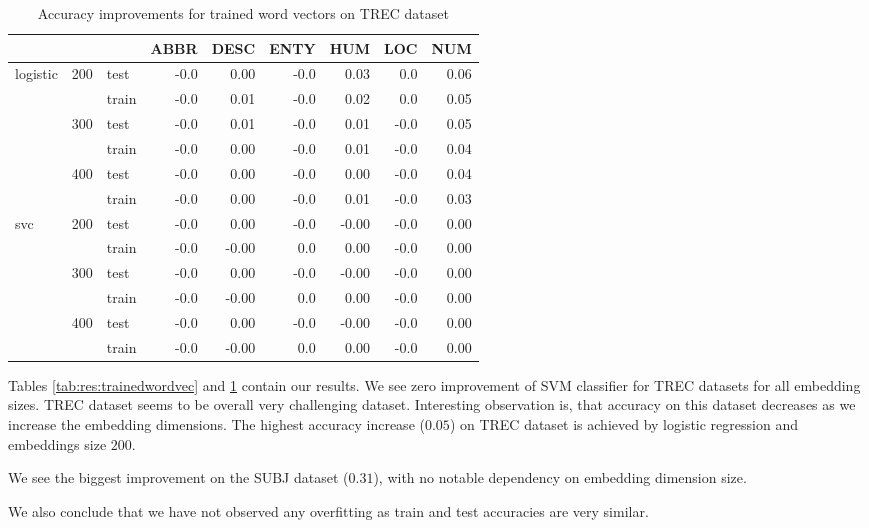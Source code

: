\begin{table}[H]
\begin{center}

\begin{tabular}{lllrrrrrr}
\toprule
 & &&ABBR &DESC &ENTY &HUM &LOC &NUM \\
\midrule
logistic & 200 & test &-0.0 &0.00 &-0.0 & 0.03 &0.0 & 0.06 \\
 & & train &-0.0 &0.01 &-0.0 & 0.02 &0.0 & 0.05 \\
 & 300 & test &-0.0 &0.01 &-0.0 & 0.01 & -0.0 & 0.05 \\
 & & train &-0.0 &0.00 &-0.0 & 0.01 & -0.0 & 0.04 \\
 & 400 & test &-0.0 &0.00 &-0.0 & 0.00 & -0.0 & 0.04 \\
 & & train &-0.0 &0.00 &-0.0 & 0.01 & -0.0 & 0.03 \\
svc & 200 & test &-0.0 &0.00 &-0.0 &-0.00 & -0.0 & 0.00 \\
 & & train &-0.0 & -0.00 & 0.0 & 0.00 & -0.0 & 0.00 \\
 & 300 & test &-0.0 &0.00 &-0.0 &-0.00 & -0.0 & 0.00 \\
 & & train &-0.0 & -0.00 & 0.0 & 0.00 & -0.0 & 0.00 \\
 & 400 & test &-0.0 &0.00 &-0.0 &-0.00 & -0.0 & 0.00 \\
 & & train &-0.0 & -0.00 & 0.0 & 0.00 & -0.0 & 0.00 \\
\bottomrule
\end{tabular}

\caption[Accuracy improvements for trained word vectors on TREC dataset]{Accuracy improvements for trained word vectors on TREC dataset}
\label{tab:res:trainedwordvec:trec}
\end{center}
\end{table}


    Tables \ref{tab:res:trainedwordvec} and \ref{tab:res:trainedwordvec:trec} contain our results.
    We see zero improvement of SVM classifier for TREC datasets for all embedding sizes.
    TREC dataset seems to be overall very challenging dataset.
    Interesting observation is, that accuracy on this dataset decreases as we increase the embedding dimensions.
    The highest accuracy increase ($0.05$) on TREC dataset is achieved by logistic regression and embeddings size $200$. 
    
    We see the biggest improvement on the SUBJ dataset ($0.31$), with no notable dependency on embedding dimension size.  
    
    We also conclude that we have not observed any overfitting as train and test accuracies are very similar.
    

